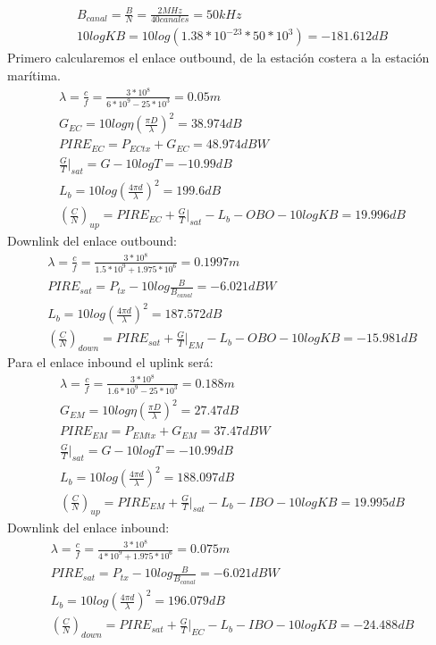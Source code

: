 \begin{exercise}[1]
\begin{gather*}
		B_{canal}=\frac{B}{N}=\frac{2MHz}{40canales}=50kHz\\
		10logKB=10log(1.38*10^{-23}*50*10^3)=-181.612dB
	\end{gather*}
	Primero calcularemos el enlace outbound, de la estación costera a la estación marítima. 
	\begin{gather*}
		\lambda=\frac{c}{f}=\frac{3*10^8}{6*10^9-25*10^3}=0.05m\\
		G_{EC}=10log\eta(\frac{\pi D}{\lambda})^2=38.974dB\\
		PIRE_{EC}=P_{ECtx}+G_{EC}=48.974dBW\\
		\frac{G}{T}|_{sat}=G-10logT=-10.99dB\\
		L_b=10log(\frac{4\pi d}{\lambda})^2=199.6dB\\
		(\frac{C}{N})_{up}=PIRE_{EC}+\frac{G}{T}|_{sat}-L_b-OBO-10logKB=19.996dB
	\end{gather*}
	Downlink del enlace outbound:
	\begin{gather*}
		\lambda=\frac{c}{f}=\frac{3*10^8}{1.5*10^9+1.975*10^6}=0.1997m\\
		PIRE_{sat}=P_{tx}-10log\frac{B}{B_{canal}}=-6.021dBW\\
		L_b=10log(\frac{4\pi d}{\lambda})^2=187.572dB\\
		(\frac{C}{N})_{down}=PIRE_{sat}+\frac{G}{T}|_{EM}-L_b-OBO-10logKB=-15.981dB
	\end{gather*}
	Para el enlace inbound el uplink será:
	\begin{gather*}
		\lambda=\frac{c}{f}=\frac{3*10^8}{1.6*10^9-25*10^3}=0.188m\\
		G_{EM}=10log\eta(\frac{\pi D}{\lambda})^2=27.47dB\\
		PIRE_{EM}=P_{EMtx}+G_{EM}=37.47dBW\\
		\frac{G}{T}|_{sat}=G-10logT=-10.99dB\\
		L_b=10log(\frac{4\pi d}{\lambda})^2=188.097dB\\
		(\frac{C}{N})_{up}=PIRE_{EM}+\frac{G}{T}|_{sat}-L_b-IBO-10logKB=19.995dB
	\end{gather*}
	Downlink del enlace inbound:
	\begin{gather*}
		\lambda=\frac{c}{f}=\frac{3*10^8}{4*10^9+1.975*10^6}=0.075m\\
		PIRE_{sat}=P_{tx}-10log\frac{B}{B_{canal}}=-6.021dBW\\
		L_b=10log(\frac{4\pi d}{\lambda})^2=196.079dB\\
		(\frac{C}{N})_{down}=PIRE_{sat}+\frac{G}{T}|_{EC}-L_b-IBO-10logKB=-24.488dB
	\end{gather*}
\end{exercise}
